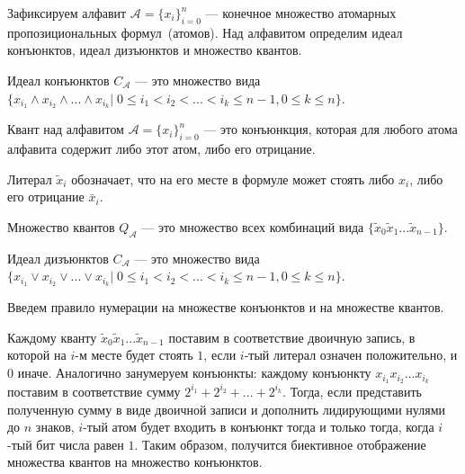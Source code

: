 Зафиксируем алфавит $\mathcal{A} = \{x_i\}^n_{i=0}$ --- конечное множество атомарных пропозициональных формул~(атомов). Над алфавитом определим идеал конъюнктов, идеал дизъюнктов и множество квантов.
\begin{definition}[\cite{1}]
Идеал конъюнктов $C_\mathcal{A} $ --- это множество вида 
\begin{math}
\{x_{i_1} \wedge x_{i_2}\wedge ... \wedge x_{i_k} | \; 0 \leq i_1 < i_2 < ... < i_k \leq  n - 1, 0 \leq k \leq n\}
\end{math}.
\end{definition}

\begin{definition}[\cite{1}]
Квант над алфавитом $\mathcal{A} = \{x_i\}^n_{i=0}$ ---  это конъюнкция, которая для любого атома алфавита содержит либо этот атом, либо его отрицание.
\end{definition}

\begin{definition}[\cite{1}]
Литерал $\tilde{x}_i$ обозначает, что на его месте в формуле может стоять либо $x_i$, либо его отрицание $\bar{x}_i$.
\end{definition}

\begin{definition}[\cite{1}]
	Множество квантов $Q_\mathcal{A} $ --- это множество всех комбинаций вида $\{\tilde{x}_0\tilde{x}_1...\tilde{x}_{n-1}\}$.
\end{definition}

\begin{definition}[\cite{184}]
Идеал дизъюнктов $C_\mathcal{A} $ --- это множество вида 
\begin{math}
\{x_{i_1} \vee x_{i_2}\vee ... \vee x_{i_k} | \; 0 \leq i_1 < i_2 < ... < i_k \leq  n - 1, 0 \leq k \leq n\}
\end{math}.
\end{definition}

Введем правило нумерации на множестве конъюнктов и на множестве квантов.

Каждому кванту $\tilde{x}_0\tilde{x}_1...\tilde{x}_{n-1}$ поставим в соответствие двоичную запись, в которой на $i$-м месте будет стоять $1$, если $i$-тый литерал означен положительно, и $0$ иначе. Аналогично занумеруем конъюнкты: каждому конъюнкту $x_{i_1}x_{i_2}...x_{i_k}$ поставим в соответствие сумму $2^{i_1}+2^{i_2}+...+2^{i_k}$. Тогда, если представить полученную сумму в виде двоичной записи и дополнить лидирующими нулями до $n$ знаков, $i$-тый атом будет входить в конъюнкт тогда и только тогда, когда $i$-тый бит числа равен $1$. Таким образом, получится биективное отображение множества квантов на множество конъюнктов.

